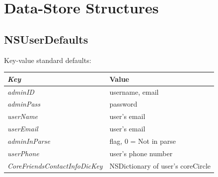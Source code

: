 %  
  
\section{Data-Store Structures}
\subsection{NSUserDefaults}
Key-value standard defaults:
	\begin{table}[ht!]%
	\begin{tabularx}{\linewidth}{ l X }
	\emph{Key} & Value \\\hline
	\emph{adminID} & username, email \\
	\emph{adminPass} & password \\
	\emph{userName} & user's email \\
	\emph{userEmail} & user's email \\
	\emph{adminInParse} & flag, 0 = Not in parse\\
	\emph{userPhone} & user's phone number \\
	\emph{CoreFriendsContactInfoDicKey} & NSDictionary of user's coreCircle\\
	\end{tabularx}
	\end{table}%
